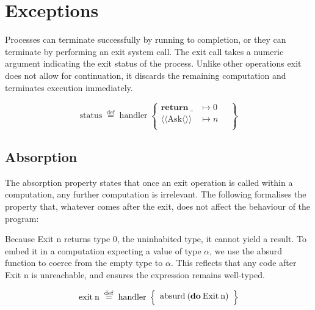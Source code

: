 \documentclass[logo,bsc,singlespacing,parskip]{infthesis}
\begin{document}
\section{Exceptions}
Processes can terminate successfully by running to completion, or they can terminate by performing an exit system call. The exit call takes a numeric argument indicating the exit status of the process. Unlike other operations exit does not allow for continuation, it discards the remaining computation and terminates execution immediately.



\[
\mathrm{status} \;\overset{\mathrm{def}}{=}\;
\mathrm{handler} \;\left\{
\begin{array}{ll}
  \mathrm{\textbf{return}\:\_} & \mapsto 0 \quad\\[0.5ex]
  \langle\!\langle \mathrm{Ask} \langle\rangle\rangle &  \mapsto n \quad\\[0.5ex]

\end{array}
\right\}
\]







\subsection*{Absorption}

The absorption property states that once an exit operation is called within a computation, any further computation is irrelevant. The following formalises the property that, whatever comes after the exit, does not affect the behaviour of the program:


Because Exit n returns type 0, the uninhabited type, it cannot yield a result. To embed it in a computation expecting a value of type $\alpha$, we use the absurd function to coerce from the empty type to $\alpha$. This reflects that any code after Exit n is unreachable, and ensures the expression remains well-typed.






\[
\mathrm{exit\:n} \;\overset{\mathrm{def}}{=}\;
\mathrm{handler} \;\left\{
\begin{array}{l}
  \text{absurd\:(\textbf{do}\:Exit\:n)} \quad\\[0.5ex]

\end{array}
\right\}
\]
\end{document}
